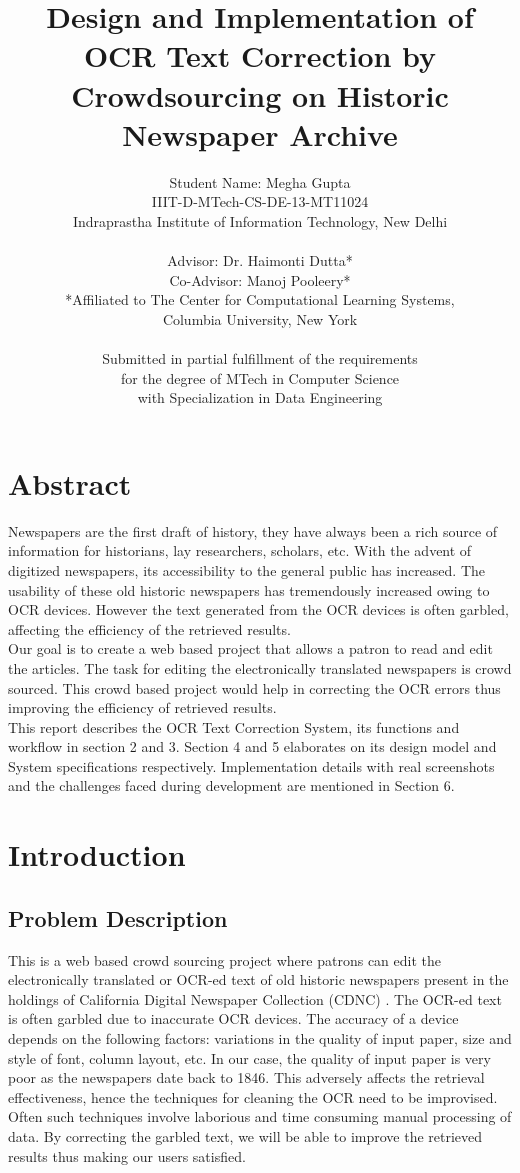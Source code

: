 \documentclass[amsart, 12pt]{article}
\title{Design and Implementation of OCR Text Correction by Crowdsourcing on Historic Newspaper Archive}
\author{Student Name: Megha Gupta\\
IIIT-D-MTech-CS-DE-13-MT11024\\
Indraprastha Institute of Information Technology,
New Delhi\\
\\
Advisor: Dr. Haimonti Dutta* \\
Co-Advisor: Manoj Pooleery* \\
*Affiliated to The Center for Computational Learning Systems,\\
Columbia University, New York\\
\\
Submitted in partial fulfillment of the requirements\\
for the degree of MTech in Computer Science\\
with Specialization in Data Engineering\\}
\begin{document}
\maketitle
\newpage
\section{Abstract}
Newspapers are the first draft of history, they have always been a rich source of information for historians, lay researchers, scholars, etc. With the advent of digitized newspapers, its accessibility to the general public has increased. 
The usability of these old historic newspapers has tremendously increased owing to OCR devices. However the text generated from the OCR devices is often garbled, affecting the efficiency of the retrieved results.\\
Our goal is to create a web based project that allows a patron to read and edit the articles. The task for editing the electronically translated newspapers is crowd sourced. This crowd based project would help in correcting the OCR errors thus improving the efficiency of retrieved results.\\
This report describes the OCR Text Correction System, its functions and workflow in section 2 and 3. Section 4 and 5 elaborates on its design model and System specifications respectively. Implementation details with real screenshots and the challenges faced during development are mentioned in Section 6.

\newpage
\tableofcontents

\newpage
\section{Introduction}

\subsection{Problem Description}
This is a web based crowd sourcing project where patrons can edit the electronically translated or OCR-ed text of old historic newspapers present in the holdings of California Digital Newspaper Collection (CDNC) \cite{cdnc}. The OCR-ed text is often garbled due to inaccurate OCR devices. The accuracy of a device depends on the following factors: variations in the quality of input paper, size and style of font, column layout, etc. In our case, the quality of input paper is very poor as the newspapers date back to 1846. This adversely affects the retrieval effectiveness, hence the techniques for cleaning the OCR \cite{OCR} need to be improvised. Often such techniques involve laborious and time consuming manual processing of data. By correcting the garbled text, we will be able to improve the retrieved results thus making our users satisfied. \\
\end{document}
